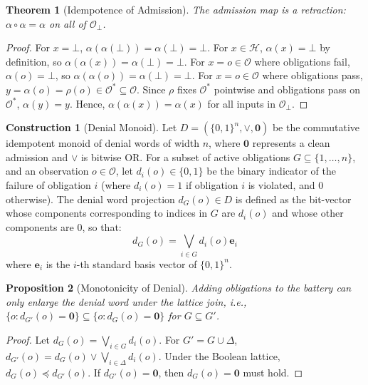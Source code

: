 \documentclass[11pt,oneside]{book}
\theoremstyle{definition}
\newtheorem{construction}{Construction}[chapter]
\theoremstyle{plain}
\newtheorem{theorem}{Theorem}[chapter]
\newtheorem{proposition}[theorem]{Proposition}
\theoremstyle{remark}
\newcommand{\Obs}{\mathcal{O}}                 %
\newcommand{\Obsbot}{\Obs_{\bot}}             %
\newcommand{\adm}{\alpha}                      %
\newcommand{\Rfsl}{\bot}                        %
\begin{document}
\begin{theorem}[Idempotence of Admission]\label{thm:idempotence}
The admission map is a retraction: $\adm \circ \adm = \adm$ on all of $\Obsbot$. %
\end{theorem}

\begin{proof}
For $x = \Rfsl$, $\adm(\adm(\Rfsl)) = \adm(\Rfsl) = \Rfsl$. %
For $x \in \mathcal{H}$, $\adm(x) = \Rfsl$ by definition, so $\adm(\adm(x)) = \adm(\Rfsl) = \Rfsl$. %
For $x = o \in \Obs$ where obligations fail, $\adm(o) = \Rfsl$, so $\adm(\adm(o)) = \adm(\Rfsl) = \Rfsl$. %
For $x = o \in \Obs$ where obligations pass, $y = \adm(o) = \rho(o) \in \Obs^* \subseteq \Obs$. %
Since $\rho$ fixes $\Obs^*$ pointwise and obligations pass on $\Obs^*$, $\adm(y) = y$. %
Hence, $\adm(\adm(x)) = \adm(x)$ for all inputs in $\Obsbot$. %
\end{proof}

\begin{construction}[Denial Monoid]\label{con:denial_monoid}
Let $D = (\{0,1\}^n, \lor, \mathbf{0})$ be the commutative idempotent monoid of denial words of width $n$, where $\mathbf{0}$ represents a clean admission and $\lor$ is bitwise OR. %
For a subset of active obligations $G \subseteq \{1, \dots, n\}$, and an observation $o \in \Obs$, let $d_i(o) \in \{0, 1\}$ be the binary indicator of the failure of obligation $i$ (where $d_i(o) = 1$ if obligation $i$ is violated, and $0$ otherwise). %
The denial word projection $d_G(o) \in D$ is defined as the bit-vector whose components corresponding to indices in $G$ are $d_i(o)$ and whose other components are $0$, so that:
\[
d_G(o) = \bigvee_{i \in G} d_i(o) \mathbf{e}_i
\]
where $\mathbf{e}_i$ is the $i$-th standard basis vector of $\{0,1\}^n$. %
\end{construction}

\begin{proposition}[Monotonicity of Denial]\label{prop:denial_mono}
Adding obligations to the battery can only enlarge the denial word under the lattice join, i.e., $\{o: d_{G'}(o)=\mathbf{0}\} \subseteq \{o: d_G(o)=\mathbf{0}\}$ for $G \subseteq G'$. %
\end{proposition}

\begin{proof}
Let $d_G(o) = \bigvee_{i \in G} d_i(o)$. %
For $G' = G \cup \Delta$, $d_{G'}(o) = d_G(o) \lor \bigvee_{i \in \Delta} d_i(o)$. %
Under the Boolean lattice, $d_G(o) \preceq d_{G'}(o)$. %
If $d_{G'}(o) = \mathbf{0}$, then $d_G(o) = \mathbf{0}$ must hold. %
\end{proof}
\end{document}
